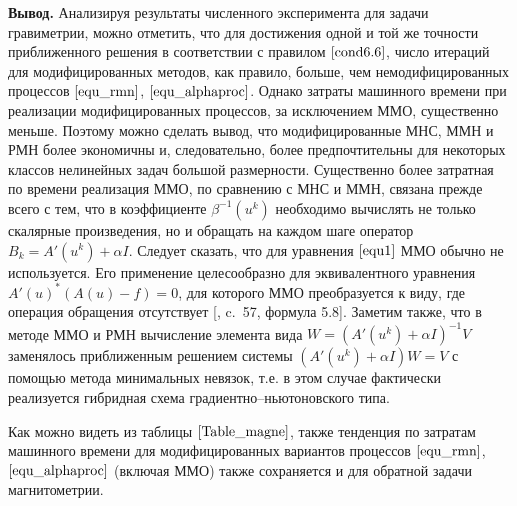 {\bfseries\large Вывод.} Анализируя результаты численного эксперимента для задачи гравиметрии, можно отметить, что для достижения одной и той же точности приближенного решения в соответствии с правилом $\eqref{cond6.6}$, число итераций для модифицированных методов, как правило, больше, чем немодифицированных процессов $\eqref{equ_rmn}$, $\eqref{equ_alphaproc}$. Однако затраты машинного времени при реализации модифицированных процессов, за исключением ММО, существенно меньше. Поэтому можно сделать вывод, что модифицированные МНС, ММН и РМН более экономичны и, следовательно, более предпочтительны для некоторых классов нелинейных задач большой размерности. Существенно более затратная по времени реализация ММО, по сравнению с МНС и ММН, связана прежде всего с тем, что в коэффициенте $\beta^{-1}(u^k)$ необходимо вычислять не только скалярные произведения, но и обращать на каждом шаге оператор $B_k=A'(u^k)+\alpha I$. Следует сказать, что для уравнения $\eqref{equ1}$ ММО обычно не используется. Его применение целесообразно для эквивалентного уравнения $A'(u)^*(A(u)-f)=0$, для которого ММО преобразуется к виду, где операция обращения отсутствует [\cite{VasEre2009},	c.~57, формула 5.8]. Заметим также, что в методе ММО и РМН вычисление элемента вида $W=(A'(u^k)+\alpha I)^{-1}V$ заменялось приближенным решением системы $(A'(u^k)+\alpha I)W=V$ с помощью метода минимальных невязок, т.е. в этом случае фактически реализуется гибридная схема градиентно--ньютоновского типа. 

Как можно видеть из таблицы $\ref{Table_magne}$, также тенденция по затратам машинного времени для модифицированных вариантов процессов $\eqref{equ_rmn}$, $\eqref{equ_alphaproc}$ (включая ММО) также сохраняется и для обратной задачи магнитометрии. 



